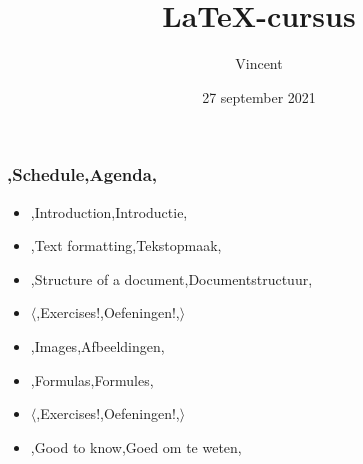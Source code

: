 

\def\importslide#1#2{%
	{#2}
}

\title{\LaTeX{}-cursus}
\author{Vincent}
\date{27 september 2021}





\begin{frame}
	\titlepage
	\centering
\end{frame}

\begin{frame}
	\frametitle{\lang,Schedule,Agenda,}
	
	\begin{itemize}
		\item \lang,Introduction,Introductie,
		\item \lang,Text formatting,Tekstopmaak,
		\item \lang,Structure of a document,Documentstructuur,
		\item $ \langle $\lang,Exercises!,Oefeningen!,$ \rangle $
		\item \lang,Images,Afbeeldingen,
		\item \lang,Formulas,Formules,
		\item $ \mathbf\langle $\lang,Exercises!,Oefeningen!,$ \rangle $
		\item \lang,Good to know,Goed om te weten,
	\end{itemize}
\end{frame}











% 




